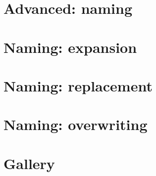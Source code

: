 \section{Advanced: naming}

\newpage
\section{Naming: expansion}

\newpage
\section{Naming: replacement}

\newpage
\section{Naming: overwriting}

\newpage
\section{Gallery}



